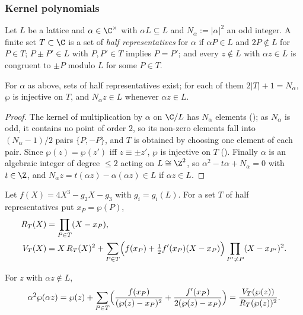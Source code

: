 \subsubsection{Kernel polynomials}
Let $L$ be a lattice and $\alpha\in\C^\times$ with $\alpha L\subseteq L$ and $N_\alpha:=|\alpha|^2$ an odd integer. A
finite set $T\subset\C$ is a set of \emph{half representatives} for $\alpha$ if $\alpha P\in L$ and $2P\notin L$ for
$P\in T$; $P\pm P'\in L$ with $P,P'\in T$ implies $P=P'$; and every $z\notin L$ with $\alpha z\in L$ is congruent to
$\pm P$ modulo $L$ for some $P\in T$.

\begin{lemma}\label{pf:reckernel:halfReps}
For $\alpha$ as above, sets of half representatives exist; for each of them $2|T|+1=N_\alpha$, $\wp$ is injective on
$T$, and $N_\alpha z\in L$ whenever $\alpha z\in L$.
\end{lemma}

\begin{proof}
The kernel of multiplication by $\alpha$ on $\C/L$ has $N_\alpha$ elements
(); as $N_\alpha$ is odd, it contains no point of order $2$, so its
non-zero elements fall into $(N_\alpha-1)/2$ pairs $\{P,-P\}$, and $T$ is obtained by choosing one element of each
pair. Since $\wp(z)=\wp(z')$ iff $z\equiv\pm z'$, $\wp$ is injective on $T$
(). Finally $\alpha$ is an algebraic integer of degree $\le2$ acting on
$L\cong\Z^2$, so $\alpha^2-t\alpha+N_\alpha=0$ with $t\in\Z$, and $N_\alpha z=t(\alpha z)-\alpha(\alpha z)\in L$ if $\alpha z\in
L$.
\end{proof}

Let $f(X)=4X^3-g_2X-g_3$ with $g_i=g_i(L)$. For a set $T$ of half representatives put $x_P=\wp(P)$,
\begin{align*}
R_T(X)&=\prod_{P\in T}(X-x_P),\\
V_T(X)&=X\,R_T(X)^2+\sum_{P\in T}\Bigl(f(x_P)+\tfrac12f'(x_P)(X-x_P)\Bigr)\prod_{P'\ne P}(X-x_{P'})^2 .
\end{align*}

\begin{lemma}\label{pf:reckernel:velu}
For $z$ with $\alpha z\notin L$,
\[
\alpha^2\wp(\alpha z)=\wp(z)+\sum_{P\in T}\Bigl(\frac{f(x_P)}{(\wp(z)-x_P)^2}+\frac{f'(x_P)}{2(\wp(z)-x_P)}\Bigr)
=\frac{V_T(\wp(z))}{R_T(\wp(z))^2}.
\]
\end{lemma}

